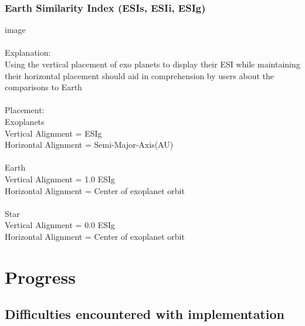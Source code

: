 \documentclass[11pt
              , a4paper
              , twoside
              , openright
              ]{report}
\begin{document}
\subsection{Earth Similarity Index (ESIs, ESIi, ESIg) }
image
\\\\
Explanation:\\
Using the vertical placement of exo planets to display their ESI while maintaining their horizontal placement should aid in comprehension by users about the comparisons to Earth
\\\\
Placement:\\
Exoplanets\\
Vertical Alignment = ESIg\\
Horizontal Alignment = Semi-Major-Axis(AU)
\\\\
Earth\\
Vertical Alignment = 1.0 ESIg\\
Horizontal Alignment = Center of exoplanet orbit
\\\\
Star\\
Vertical Alignment = 0.0 ESIg\\
Horizontal Alignment =  Center of exoplanet orbit

\chapter{Progress}
\section{Difficulties encountered with implementation}
\end{document}
